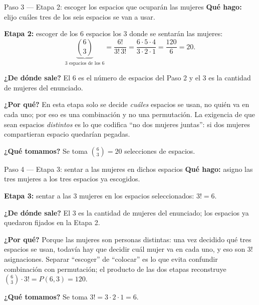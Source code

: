 \documentclass[11pt]{article}
\begin{document}
\begin{paso}{Paso 3 --- Etapa 2: escoger los espacios que ocuparán las mujeres}
\textbf{Qué hago:} elijo cuáles tres de los seis espacios se van a usar.

\medskip
\textbf{Etapa 2:} escoger de los $6$ espacios los $3$ donde se sentarán las mujeres:
\[
  \underbrace{\binom{6}{3}}_{\text{3 espacios de los 6}} = \frac{6!}{3!\,3!} = \frac{6\cdot 5\cdot 4}{3\cdot 2\cdot 1} = \frac{120}{6} = 20 .
\]

\textbf{¿De dónde sale?} El $6$ es el número de espacios del Paso 2 y el $3$ es la cantidad de mujeres del enunciado.

\textbf{¿Por qué?} En esta etapa solo se decide \emph{cuáles} espacios se usan, no quién va en cada uno; por eso es una combinación y no una permutación. La exigencia de que sean espacios \emph{distintos} es lo que codifica ``no dos mujeres juntas'': si dos mujeres compartieran espacio quedarían pegadas.

\textbf{¿Qué tomamos?} Se toma $\binom{6}{3}=20$ selecciones de espacios.
\end{paso}

\begin{paso}{Paso 4 --- Etapa 3: sentar a las mujeres en dichos espacios}
\textbf{Qué hago:} asigno las tres mujeres a los tres espacios ya escogidos.

\medskip
\textbf{Etapa 3:} sentar a las $3$ mujeres en los espacios seleccionados: $3!=6$.

\textbf{¿De dónde sale?} El $3$ es la cantidad de mujeres del enunciado; los espacios ya quedaron fijados en la Etapa 2.

\textbf{¿Por qué?} Porque las mujeres son personas distintas: una vez decidido qué tres espacios se usan, todavía hay que decidir cuál mujer va en cada uno, y eso son $3!$ asignaciones. Separar ``escoger'' de ``colocar'' es lo que evita confundir combinación con permutación; el producto de las dos etapas reconstruye $\binom{6}{3}\cdot 3! = P(6,3) = 120$.

\textbf{¿Qué tomamos?} Se toma $3!=3\cdot 2\cdot 1=6$.
\end{paso}
\end{document}
